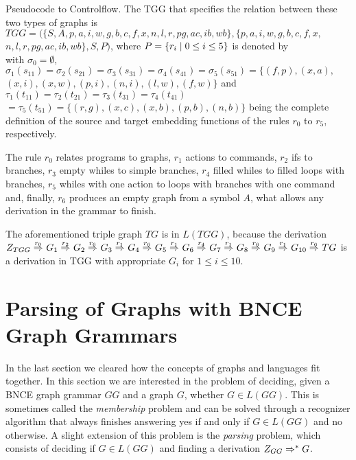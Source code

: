 \documentclass[]{report}
\begin{document}
\begin{example}{Pseudocode to Controlflow.}
	The TGG that specifies the relation between these two types of graphs is $TGG = (\{S, A, p, a, i, w, g, b, c, f, x, n, l, r, pg, ac, ib, wb\}, \{p, a, i, w, g, b, c, f, x,$ $ n, l, r, pg, ac, ib, wb\}, S, P)$, where $P = \{r_i \; | \; 0 \le i \le 5\}$ is denoted by\\
	
	
	\noindent
	with $\sigma_0 = \emptyset$, $\sigma_1(s_{11}) = \sigma_2(s_{21}) = \sigma_3(s_{31}) = \sigma_4(s_{41}) =\sigma_5(s_{51}) = \{ (f,p), (x,a), $ $(x,i), (x,w), (p,i), (n,i), (l,w), (f,w) \}$ and $\tau_1(t_{11}) = \tau_2(t_{21}) = \tau_3(t_{31}) = \tau_4(t_{41}) $ $= \tau_5(t_{51}) = \{ (r,g), (x,c), (x,b), (p,b), (n,b)\}$ being the complete definition of the source and target embedding functions of the rules $r_0$ to $r_5$, respectively.
	
	The rule $r_0$ relates programs to graphs, $r_1$ actions to commands, $r_2$ ifs to branches, $r_3$ empty whiles to simple branches, $r_4$ filled whiles to filled loops with branches, $r_5$ whiles with one action to loops with branches with one command and, finally, $r_6$ produces an empty graph from a symbol $A$, what allows any derivation in the grammar to finish.
	
	The aforementioned triple graph $TG$ is in $L(TGG)$, because the derivation
	$
	\startTG{TGG} \tderiv{r_0}{}{} G_1 \tderiv{r_2}{}{} G_2 \tderiv{r_6}{}{} G_3 \tderiv{r_1}{}{} G_4 \tderiv{r_6}{}{} G_5 \tderiv{r_1}{}{} G_6 \tderiv{r_4}{}{} G_7 \tderiv{r_1}{}{} G_8 \tderiv{r_6}{}{} G_9 \tderiv{r_1}{}{} G_{10} \tderiv{r_6}{}{} TG
	$
	is a derivation in TGG with appropriate $G_i$ for $1 \le i \le 10$.
\end{example}

\section{Parsing of Graphs with BNCE Graph Grammars}
In the last section we cleared how the concepts of graphs and languages fit together. In this section we are interested in the problem of deciding, given a BNCE graph grammar $GG$ and a graph $G$, whether $G \in L(GG)$. This is sometimes called the \textit{membership} problem and can be solved through a recognizer algorithm that always finishes answering yes if and only if $G \in L(GG)$ and no otherwise. A slight extension of this problem is the \textit{parsing} problem, which consists of deciding if $G \in L(GG)$ and finding a derivation $Z_{GG} \Rightarrow^*_{} G$.
\end{document}
